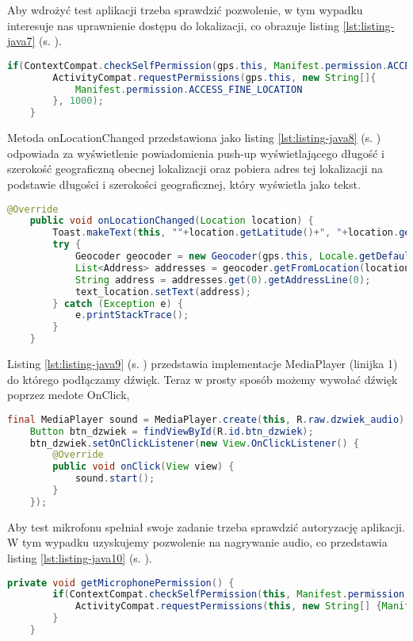 Aby wdrożyć test aplikacji trzeba sprawdzić pozwolenie, w tym wypadku interesuje nas uprawnienie dostępu do lokalizacji, co obrazuje listing  \ref{lst:listing-java7} (s. \pageref{lst:listing-java7}). 
\begin{lstlisting}[caption=GPS - Dostęp do lokazlizacji, label={lst:listing-java7}, language=Java]
	if(ContextCompat.checkSelfPermission(gps.this, Manifest.permission.ACCESS_FINE_LOCATION) != PackageManager.PERMISSION_GRANTED) {
		ActivityCompat.requestPermissions(gps.this, new String[]{
			Manifest.permission.ACCESS_FINE_LOCATION
		}, 1000);
	}
\end{lstlisting}

\newpage


Metoda onLocationChanged przedstawiona jako listing \ref{lst:listing-java8} (s. \pageref{lst:listing-java8}) odpowiada za wyświetlenie powiadomienia push-up wyświetlającego długość i szerokość geograficzną obecnej lokalizacji oraz pobiera adres tej lokalizacji na podstawie długości i szerokości geograficznej, który wyświetla jako tekst.
\begin{lstlisting}[caption=GPS - Wyświetlanie lokalizacji, label={lst:listing-java8}, language=Java]
	@Override
	public void onLocationChanged(Location location) {
		Toast.makeText(this, ""+location.getLatitude()+", "+location.getLongitude(), Toast.LENGTH_SHORT).show();
		try {
			Geocoder geocoder = new Geocoder(gps.this, Locale.getDefault());
			List<Address> addresses = geocoder.getFromLocation(location.getLatitude(), location.getLongitude(), 1);
			String address = addresses.get(0).getAddressLine(0);
			text_location.setText(address);
		} catch (Exception e) {
			e.printStackTrace();
		}
	}
\end{lstlisting}


Listing \ref{lst:listing-java9} (s. \pageref{lst:listing-java9}) przedstawia implementacje MediaPlayer (linijka 1) do którego podłączamy dźwięk. Teraz w prosty sposób możemy wywołać dźwięk poprzez medote OnClick,
\begin{lstlisting}[caption= Dźwięk - Działanie z wykorzystaniem MediaPlayer, label={lst:listing-java9}, language=Java]
	final MediaPlayer sound = MediaPlayer.create(this, R.raw.dzwiek_audio);
	Button btn_dzwiek = findViewById(R.id.btn_dzwiek);
	btn_dzwiek.setOnClickListener(new View.OnClickListener() {
		@Override
		public void onClick(View view) {
			sound.start();
		}
	});
\end{lstlisting}

\newpage


Aby test mikrofonu spełniał swoje zadanie trzeba sprawdzić autoryzację aplikacji. W tym wypadku uzyskujemy pozwolenie na nagrywanie audio, co przedstawia listing \ref{lst:listing-java10} (s. \pageref{lst:listing-java10}). 
\begin{lstlisting}[caption=Mikrofon - Dostęp do nagrywania audio, label={lst:listing-java10}, language=Java]
	private void getMicrophonePermission() {
		if(ContextCompat.checkSelfPermission(this, Manifest.permission.RECORD_AUDIO) == PackageManager.PERMISSION_DENIED) {
			ActivityCompat.requestPermissions(this, new String[] {Manifest.permission.RECORD_AUDIO}, MICROPHONE_PERMISSION_CODE);
		}
	}
\end{lstlisting}


